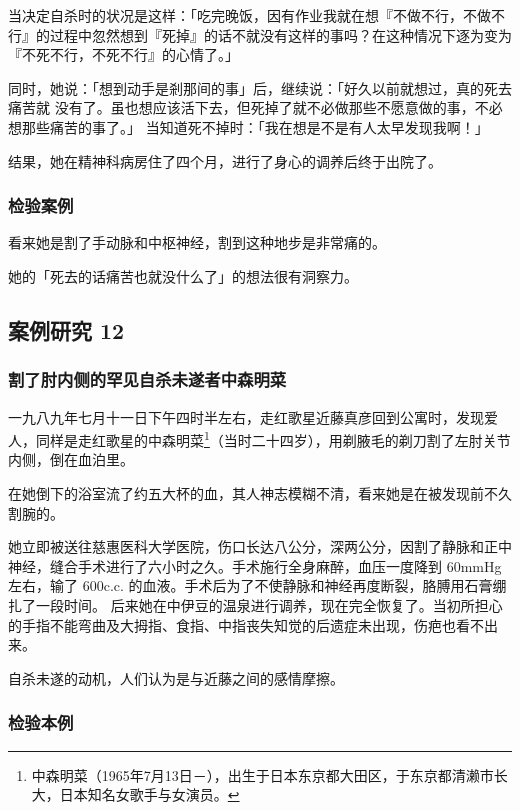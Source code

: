 \documentclass[UTF8]{ctexart}
\begin{document}
当决定自杀时的状况是这样：「吃完晚饭，因有作业我就在想『不做不行，不做不行』的过程中忽然想到『死掉』的话不就没有这样的事吗？在这种情况下逐为变为『不死不行，不死不行』的心情了。」

同时，她说：「想到动手是剎那间的事」后，继续说：「好久以前就想过，真的死去痛苦就 没有了。虽也想应该活下去，但死掉了就不必做那些不愿意做的事，不必想那些痛苦的事了。」 当知道死不掉时：「我在想是不是有人太早发现我啊！」

结果，她在精神科病房住了四个月，进行了身心的调养后终于出院了。

\subsubsection*{检验案例}

看来她是割了手动脉和中枢神经，割到这种地步是非常痛的。

她的「死去的话痛苦也就没什么了」的想法很有洞察力。

\subsection{案例研究 12}
\subsubsection*{割了肘内侧的罕见自杀未遂者中森明菜}

一九八九年七月十一日下午四时半左右，走红歌星近藤真彦回到公寓时，发现爱人，同样是走红歌星的中森明菜\footnote{中森明菜（1965年7月13日－\qquad \qquad ），出生于日本东京都大田区，于东京都清濑市长大，日本知名女歌手与女演员。}（当时二十四岁），用剃腋毛的剃刀割了左肘关节内侧，倒在血泊里。

在她倒下的浴室流了约五大杯的血，其人神志模糊不清，看来她是在被发现前不久割腕的。

她立即被送往慈惠医科大学医院，伤口长达八公分，深两公分，因割了静脉和正中神经，缝合手术进行了六小时之久。手术施行全身麻醉，血压一度降到 60mmHg 左右，输了 600c.c. 的血液。手术后为了不使静脉和神经再度断裂，胳膊用石膏绷扎了一段时间。 后来她在中伊豆的温泉进行调养，现在完全恢复了。当初所担心的手指不能弯曲及大拇指、食指、中指丧失知觉的后遗症未出现，伤疤也看不出来。

自杀未遂的动机，人们认为是与近藤之间的感情摩擦。

\subsubsection*{检验本例}
\end{document}
